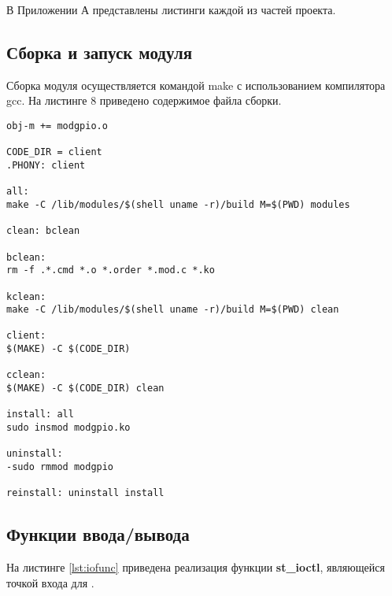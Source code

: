 В Приложении А представлены листинги каждой из частей проекта.

\subsection{Сборка и запуск модуля}
Сборка модуля осуществляется командой make с использованием компилятора gcc. На листинге 8 приведено содержимое файла сборки.
\begin{lstlisting}[caption = {Makefile}, label=lst:make]
obj-m += modgpio.o

CODE_DIR = client
.PHONY: client

all:
make -C /lib/modules/$(shell uname -r)/build M=$(PWD) modules

clean: bclean

bclean:
rm -f .*.cmd *.o *.order *.mod.c *.ko

kclean:
make -C /lib/modules/$(shell uname -r)/build M=$(PWD) clean

client:
$(MAKE) -C $(CODE_DIR)

cclean:
$(MAKE) -C $(CODE_DIR) clean

install: all
sudo insmod modgpio.ko

uninstall:
-sudo rmmod modgpio

reinstall: uninstall install
\end{lstlisting}

\subsection{Функции ввода/вывода}
На листинге \ref{lst:iofunc} приведена реализация функции \textbf{st\_ioctl}, являющейся точкой входа для .


